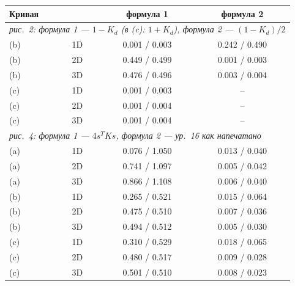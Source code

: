 \begin{tabular}{llcc}
\toprule
Кривая & & формула 1 & формула 2 \\
\midrule
\multicolumn{4}{l}{\emph{рис.~2: формула 1 --- $1-K_d$ (в (c): $1+K_d$), формула 2 --- $(1-K_d)/2$}} \\
(b) & 1D & 0.001 / 0.003 & 0.242 / 0.490 \\
(b) & 2D & 0.449 / 0.499 & 0.001 / 0.003 \\
(b) & 3D & 0.476 / 0.496 & 0.003 / 0.004 \\
(c) & 1D & 0.001 / 0.003 & -- \\
(c) & 2D & 0.001 / 0.004 & -- \\
(c) & 3D & 0.001 / 0.004 & -- \\
\midrule
\multicolumn{4}{l}{\emph{рис.~4: формула 1 --- $4s^TKs$, формула 2 --- ур.~16 как напечатано}} \\
(a) & 1D & 0.076 / 1.050 & 0.013 / 0.040 \\
(a) & 2D & 0.741 / 1.097 & 0.005 / 0.042 \\
(a) & 3D & 0.866 / 1.108 & 0.006 / 0.040 \\
(b) & 1D & 0.265 / 0.521 & 0.015 / 0.064 \\
(b) & 2D & 0.475 / 0.510 & 0.007 / 0.036 \\
(b) & 3D & 0.494 / 0.512 & 0.005 / 0.030 \\
(c) & 1D & 0.310 / 0.529 & 0.018 / 0.065 \\
(c) & 2D & 0.480 / 0.517 & 0.009 / 0.028 \\
(c) & 3D & 0.501 / 0.510 & 0.008 / 0.023 \\
\bottomrule
\end{tabular}
